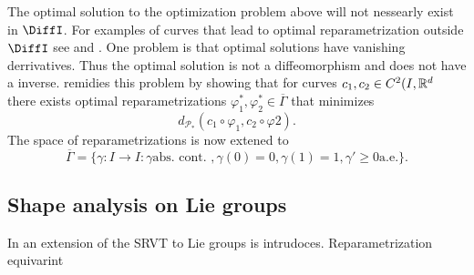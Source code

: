 The optimal solution to the optimization problem above will not nessearly exist in \(\DiffI\). For examples of curves that lead to optimal reparametrization outside \(\DiffI\) see \cite[p.11]{bauer2014overview} and \cite[3.2]{woien2019}. One problem is that optimal solutions  have vanishing derrivatives. Thus the optimal solution is not a diffeomorphism and does not have a inverse. \citeauthor{bruveris1016_srvtexample} \cite{bruveris1016_srvtexample}  remidies this problem by showing that for curves \(c_1, c_2 \in C^2(I,\mathbb{R}^d\) there exists optimal reparametrizations \(\varphi_1^*, \varphi_2^* \in \overline{ \Gamma}\) that minimizes
\begin{equation}
  d_{\mathcal{P}_*}(c_1 \circ \varphi_1, c_2 \circ \varphi2). 
\end{equation}
The space of reparametrizations is now extened to 
\begin{equation}
  \overline \Gamma = \{\gamma : I \rightarrow I : \gamma \text{abs. cont. }, \gamma(0) = 0, \gamma(1) = 1, \gamma' \geq 0 \text{a.e.}\}.
\end{equation}

\subsection{Shape analysis on Lie groups}\label{subsec:shape-lie}
In \cite{celledoni2016} an extension of the SRVT to Lie groups is intrudoces. 
Reparametrization equivarint 
